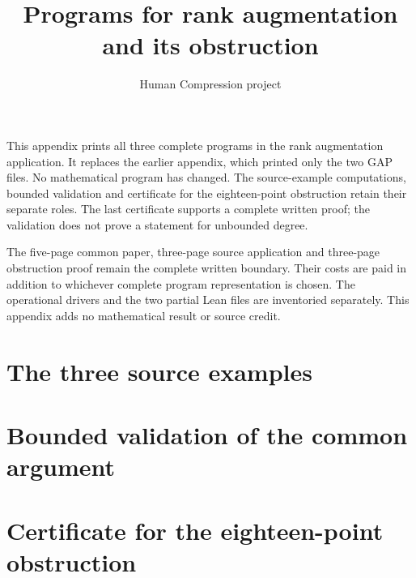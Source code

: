 \documentclass[a4paper,10pt]{article}
\title{Programs for rank augmentation and its obstruction}
\author{Human Compression project}\date{}
\begin{document}
\maketitle
This appendix prints all three complete programs in the rank augmentation
application. It replaces the earlier appendix, which printed only the two GAP
files. No mathematical program has changed. The source-example computations,
bounded validation and certificate for the eighteen-point obstruction retain
their separate roles. The last certificate supports a complete written proof;
the validation does not prove a statement for unbounded degree.

The five-page common paper, three-page source application and three-page
obstruction proof remain the complete written boundary. Their costs are paid
in addition to whichever complete program representation is chosen. The
operational drivers and the two partial Lean files are inventoried separately.
This appendix adds no mathematical result or source credit.

\section*{The three source examples}
\section*{Bounded validation of the common argument}
\section*{Certificate for the eighteen-point obstruction}
\end{document}
